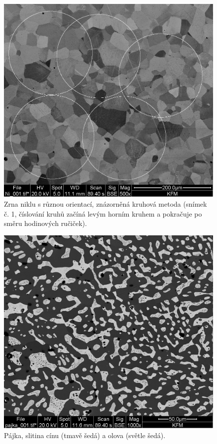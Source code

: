 \begin{figure}[htbp]
\centering
\includegraphics[width=\textwidth-6cm]{graficos/Ni_001.png}
\caption{Zrna niklu s různou orientací, znázorněná kruhová metoda (snímek č. 1, číslování kruhů začíná levým horním kruhem a pokračuje po směru hodinových ručiček).}
\label{o:Ni}
\end{figure}

\begin{figure}[t]
\centering
\includegraphics[width=\textwidth-6cm]{graficos/pajka1.png}
\caption{Pájka, slitina cínu (tmavě šedá) a olova (světle šedá).}
\label{o:pajka}
\end{figure}